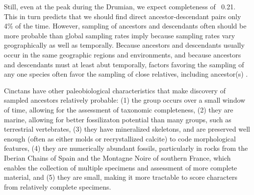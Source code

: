 \documentclass{article}
\begin{document}
Still, even at the peak during the Drumian, we expect completeness of ~0.21. This in turn predicts that we should find direct ancestor-descendant pairs only 4\% of the time.  However, sampling of ancestors and descendants often should be more probable than global sampling rates imply because sampling rates vary geographically as well as temporally. Because ancestors and descendants usually occur in the same geographic regions and environments, and because ancestors and descendants must at least abut temporally, factors favoring the sampling of any one species often favor the sampling of close relatives, including ancestor(s) \citep{WagnerErwin1995}. 

Cinctans have other paleobiological characteristics that make discovery of sampled ancestors relatively probable: (1) the group occurs over a small window of time, allowing for the assessment of taxonomic completeness, (2) they are marine, allowing for better fossilizaton potential than many groups, such as terrestrial vertebrates, (3) they have mineralized skeletons, and are preserved well enough (often as either molds or recrystallized calcite) to code morphological features, (4) they are numerically abundant fossils, particularly in rocks from the Iberian Chains of Spain and the Montagne Noire of southern France, which enables the collection of multiple specimens and assessment of more complete material, and (5) they are small, making it more tractable to score characters from relatively complete specimens.
\end{document}
